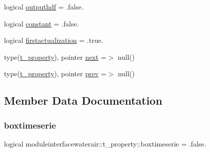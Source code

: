 \begin{DoxyCompactItemize}
\item 
logical \mbox{\hyperlink{structmoduleinterfacewaterair_1_1t__property_a377d57218f8e6066feeb84a41d50366b}{outputhdf}} = .false.
\item 
logical \mbox{\hyperlink{structmoduleinterfacewaterair_1_1t__property_a0d9123bf44f46f6894ca7b4598be4877}{constant}} = .false.
\item 
logical \mbox{\hyperlink{structmoduleinterfacewaterair_1_1t__property_ab548a24a89e55b84bb7cde11943dc29b}{firstactualization}} = .true.
\item 
type(\mbox{\hyperlink{structmoduleinterfacewaterair_1_1t__property}{t\+\_\+property}}), pointer \mbox{\hyperlink{structmoduleinterfacewaterair_1_1t__property_a7d391a03e3e50a2e2fe3c55720092f72}{next}} =$>$ null()
\item 
type(\mbox{\hyperlink{structmoduleinterfacewaterair_1_1t__property}{t\+\_\+property}}), pointer \mbox{\hyperlink{structmoduleinterfacewaterair_1_1t__property_af0c90bc1600735072489e2c04f181619}{prev}} =$>$ null()
\end{DoxyCompactItemize}


\subsection{Member Data Documentation}
\mbox{\label{structmoduleinterfacewaterair_1_1t__property_a810f4d23e214a6a245aee600558162da}} 
\subsubsection{\texorpdfstring{boxtimeserie}{boxtimeserie}}
{\footnotesize\ttfamily logical moduleinterfacewaterair\+::t\+\_\+property\+::boxtimeserie = .false.\hspace{0.3cm}{\ttfamily [private]}}

\mbox{\label{structmoduleinterfacewaterair_1_1t__property_a83db6d199f2bd535efd4e85a6af78745}} 
